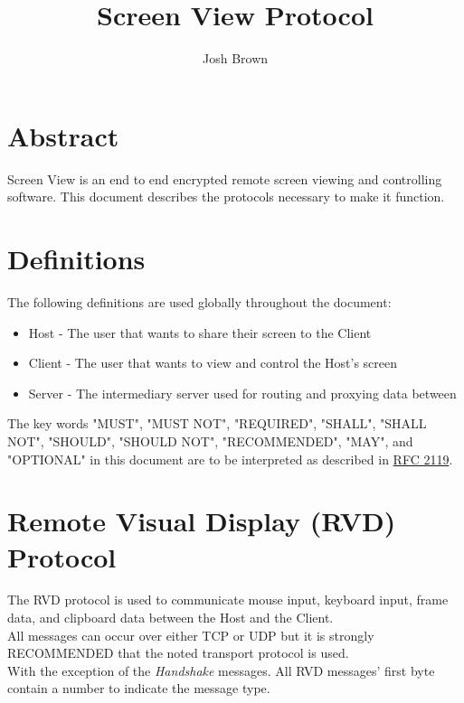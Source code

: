 \documentclass{article}
\title{Screen View Protocol}
\author{Josh Brown}
\newcommand{\projectName}{Screen View}
\begin{document}
    \maketitle
    \newpage


    \section{Abstract}
    \projectName{} is an end to end encrypted remote screen viewing and controlling software. This document describes
    the protocols necessary to make it function.
    \newpage


    \tableofcontents
    \newpage


    \section{Definitions}
    The following definitions are used globally throughout the document:

    \begin{itemize}
        \item Host - The user that wants to share their screen to the Client
        \item Client - The user that wants to view and control the Host's screen
        \item Server - The intermediary server used for routing and proxying data between
    \end{itemize}


    The key words "MUST", "MUST NOT", "REQUIRED", "SHALL", "SHALL NOT",
    "SHOULD", "SHOULD NOT", "RECOMMENDED", "MAY", and "OPTIONAL" in this
    document are to be interpreted as described in \href{https://datatracker.ietf.org/doc/html/rfc2119}{RFC 2119}.

    \newpage
    \section{Remote Visual Display (RVD) Protocol}

    The RVD protocol is used to communicate mouse input, keyboard input, frame data, and clipboard data between the Host and the Client.\\

    All messages can occur over either TCP or UDP but it is strongly RECOMMENDED that the noted transport protocol is used.\\

    With the exception of the \emph{Handshake} messages. All RVD messages' first byte contain a number to indicate the message type.
\end{document}
